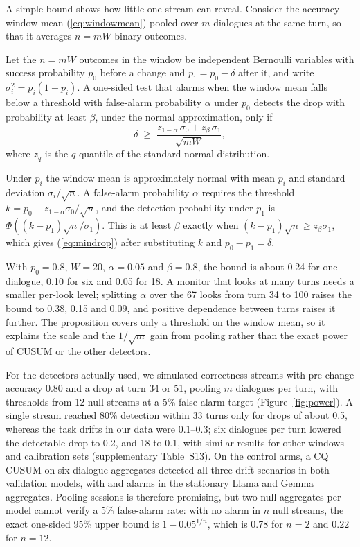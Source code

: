 A simple bound shows how little one stream can reveal. Consider the accuracy
window mean (\ref{eq:windowmean}) pooled over $m$ dialogues at the same turn,
so that it averages $n=mW$ binary outcomes.

\begin{proposition}
\label{prop:mindrop}
Let the $n=mW$ outcomes in the window be independent Bernoulli variables with
success probability $p_0$ before a change and $p_1=p_0-\delta$ after it, and
write $\sigma_i^2=p_i(1-p_i)$. A one-sided test that alarms when the window
mean falls below a threshold with false-alarm probability $\alpha$ under $p_0$
detects the drop with probability at least $\beta$, under the normal
approximation, only if
\begin{equation}
  \delta \;\ge\; \frac{z_{1-\alpha}\,\sigma_0 + z_{\beta}\,\sigma_1}{\sqrt{mW}},
  \label{eq:mindrop}
\end{equation}
where $z_q$ is the $q$-quantile of the standard normal distribution.
\end{proposition}

\begin{pf}
Under $p_i$ the window mean is approximately normal with mean $p_i$ and
standard deviation $\sigma_i/\sqrt{n}$. A false-alarm probability $\alpha$
requires the threshold $k=p_0-z_{1-\alpha}\sigma_0/\sqrt{n}$, and the detection
probability under $p_1$ is $\Phi\!\left((k-p_1)\sqrt{n}/\sigma_1\right)$. This
is at least $\beta$ exactly when $(k-p_1)\sqrt{n}\ge z_\beta\sigma_1$, which
gives (\ref{eq:mindrop}) after substituting $k$ and $p_0-p_1=\delta$.
\end{pf}

With $p_0=0.8$, $W=20$, $\alpha=0.05$ and $\beta=0.8$, the bound is about 0.24
for one dialogue, 0.10 for six and 0.05 for 18. A monitor that looks at many
turns needs a smaller per-look level; splitting $\alpha$ over the 67 looks from
turn 34 to 100 raises the bound to 0.38, 0.15 and 0.09, and positive dependence
between turns raises it further. The proposition covers only a threshold on
the window mean, so it explains the scale and the $1/\sqrt{m}$ gain from
pooling rather than the exact power of CUSUM or the other detectors.

For the detectors actually used, we simulated correctness streams with
pre-change accuracy 0.80 and a drop at turn 34 or 51, pooling $m$ dialogues per
turn, with thresholds from 12 null streams at a 5\% false-alarm target
(Figure~\ref{fig:power}). A single stream reached 80\% detection within 33
turns only for drops of about 0.5, whereas the task drifts in our data were
0.1--0.3; six dialogues per turn lowered the detectable drop to 0.2, and 18 to
0.1, with similar results for other windows and calibration sets
(supplementary Table~S13). On the control arms, a CQ CUSUM on
six-dialogue aggregates detected all three drift scenarios in both validation
models, with \valLlamaAggNull{} and \valGemmaAggNull{} alarms in the stationary
Llama and Gemma aggregates. Pooling sessions is therefore promising, but two
null aggregates per model cannot verify a 5\% false-alarm rate: with no alarm
in $n$ null streams, the exact one-sided 95\% upper bound is $1-0.05^{1/n}$,
which is 0.78 for $n=2$ and 0.22 for $n=12$.

